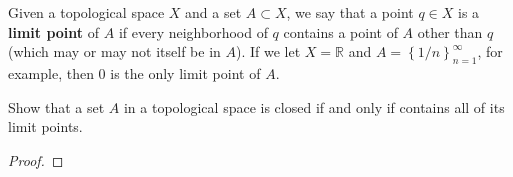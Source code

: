 \documentclass{mathnotes}
\begin{document}
\begin{defn}
    Given a topological space $X$ and a set $A\subset X$, we say that a point $q\in X$ is a \textbf{limit point} of $A$ if every neighborhood
    of $q$ contains a point of $A$ other than $q$ (which may or may not itself be in $A$). If we let $X=\mathbb{R}$ and $A=\left\{ 1/n \right\}_{n=1}^\infty$,
    for example, then 0 is the only limit point of $A$.
\end{defn}

\begin{exc}
    Show that a set $A$ in a topological space is closed if and only if contains all of its limit points.
\end{exc}
\begin{proof}
    
\end{proof}
\end{document}
